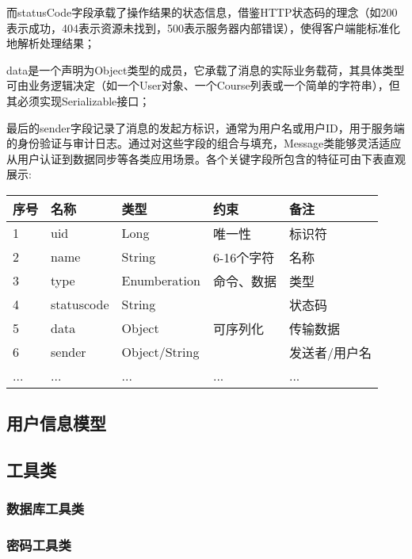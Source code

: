 而statusCode字段承载了操作结果的状态信息，借鉴HTTP状态码的理念（如200表示成功，404表示资源未找到，500表示服务器内部错误），使得客户端能标准化地解析处理结果；

data是一个声明为Object类型的成员，它承载了消息的实际业务载荷，其具体类型可由业务逻辑决定（如一个User对象、一个Course列表或一个简单的字符串），但其必须实现Serializable接口；

最后的sender字段记录了消息的发起方标识，通常为用户名或用户ID，用于服务端的身份验证与审计日志。通过对这些字段的组合与填充，Message类能够灵活适应从用户认证到数据同步等各类应用场景。各个关键字段所包含的特征可由下表直观展示:


\begin{tabular}{lllll}
    \toprule
    \textbf{序号} & \textbf{名称} & \textbf{类型}    & \textbf{约束}            & \textbf{备注} \\
    \midrule
    1           & uid           & Long           & 唯一性        &标识符\\
    2           & name          & String         & 6-16个字符    &名称  \\
    3           & type          & Enumberation   & 命令、数据     &类型 \\
    4           & statuscode    & String         &               &状态码           \\
    5           & data          & Object         & 可序列化       &传输数据   \\
    6           & sender        & Object/String  &               &发送者/用户名\\
    ...         & ...           & ...            &...            &...\\
    \bottomrule
\end{tabular}
\subsection{用户信息模型}
\subsection{工具类}
\subsubsection{数据库工具类}
\subsubsection{密码工具类}


